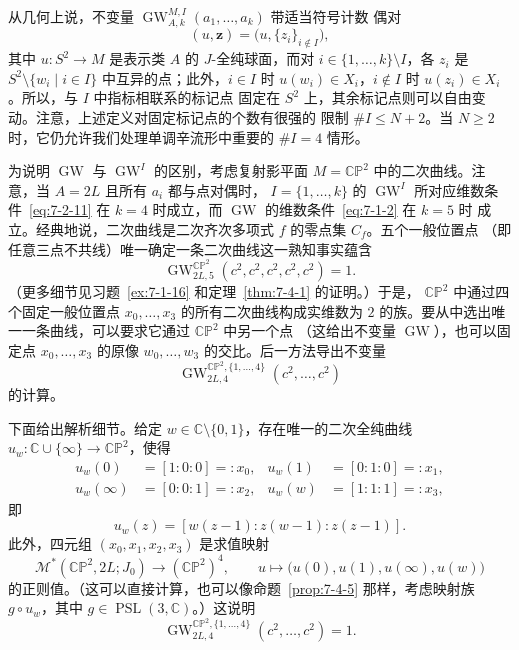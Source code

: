 从几何上说，不变量 $\operatorname{GW}^{M,I}_{A,k}(a_1,\ldots,a_k)$ 带适当符号计数
偶对
\[
  (u,\mathbf z)=\bigl(u,\{z_i\}_{i\notin I}\bigr),
\]
其中 $u:S^2\to M$ 是表示类 $A$ 的 $J$-全纯球面，而对
$i\in\{1,\ldots,k\}\setminus I$，各 $z_i$ 是
$S^2\setminus\{w_i\mid i\in I\}$ 中互异的点；此外，$i\in I$ 时
$u(w_i)\in X_i$，$i\notin I$ 时 $u(z_i)\in X_i$。所以，与 $I$ 中指标相联系的标记点
固定在 $S^2$ 上，其余标记点则可以自由变动。注意，上述定义对固定标记点的个数有很强的
限制 $\#I\leq N+2$。当 $N\geq2$ 时，它仍允许我们处理单调辛流形中重要的
$\#I=4$ 情形。

\begin{example}\label{ex:7-2-9}
为说明 $\operatorname{GW}$ 与 $\operatorname{GW}^{I}$ 的区别，考虑复射影平面
$M=\mathbb{CP}^2$ 中的二次曲线。注意，当 $A=2L$ 且所有 $a_i$ 都与点对偶时，
$I=\{1,\ldots,k\}$ 的 $\operatorname{GW}^{I}$ 所对应维数条件~\eqref{eq:7-2-11}
在 $k=4$ 时成立，而 $\operatorname{GW}$ 的维数条件~\eqref{eq:7-1-2} 在 $k=5$ 时
成立。经典地说，二次曲线是二次齐次多项式 $f$ 的零点集 $C_f$。五个一般位置点
（即任意三点不共线）唯一确定一条二次曲线这一熟知事实蕴含
\[
  \operatorname{GW}^{\mathbb{CP}^2}_{2L,5}(c^2,c^2,c^2,c^2,c^2)=1.
\]
（更多细节见习题~\ref{ex:7-1-16} 和定理~\ref{thm:7-4-1} 的证明。）于是，
$\mathbb{CP}^2$ 中通过四个固定一般位置点 $x_0,\ldots,x_3$ 的所有二次曲线构成实维数为
$2$ 的族。要从中选出唯一一条曲线，可以要求它通过 $\mathbb{CP}^2$ 中另一个点
（这给出不变量 $\operatorname{GW}$），也可以固定点 $x_0,\ldots,x_3$ 的原像
$w_0,\ldots,w_3$ 的交比。后一方法导出不变量
\[
  \operatorname{GW}^{\mathbb{CP}^2,\{1,\ldots,4\}}_{2L,4}
  (c^2,\ldots,c^2)
\]
的计算。

下面给出解析细节。给定 $w\in\mathbb C\setminus\{0,1\}$，存在唯一的二次全纯曲线
$u_w:\mathbb C\cup\{\infty\}\to\mathbb{CP}^2$，使得
\[
\begin{aligned}
  u_w(0)&=[1:0:0]=:x_0,
  &u_w(1)&=[0:1:0]=:x_1,\\
  u_w(\infty)&=[0:0:1]=:x_2,
  &u_w(w)&=[1:1:1]=:x_3,
\end{aligned}
\]
即
\[
  u_w(z)=[w(z-1):z(w-1):z(z-1)].
\]
此外，四元组 $(x_0,x_1,x_2,x_3)$ 是求值映射
\[
  \mathcal M^*(\mathbb{CP}^2,2L;J_0)
  \longrightarrow(\mathbb{CP}^2)^4,
  \qquad
  u\longmapsto\bigl(u(0),u(1),u(\infty),u(w)\bigr)
\]
的正则值。（这可以直接计算，也可以像命题~\ref{prop:7-4-5} 那样，考虑映射族
$g\circ u_w$，其中 $g\in\operatorname{PSL}(3,\mathbb C)$。）这说明
\[
  \operatorname{GW}^{\mathbb{CP}^2,\{1,\ldots,4\}}_{2L,4}
  (c^2,\ldots,c^2)=1.
\]


\end{example}
